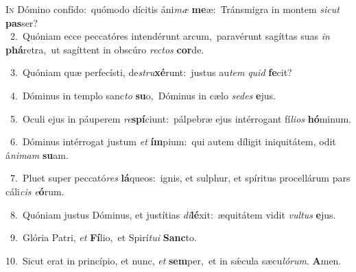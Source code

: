 \lettrine{\initial\textcolor{\initialcolor}{I}}{n} Dómino confído:~\dagger quómodo dícitis áni\textit{mæ} \textbf{me}\-æ:~\star Tránsmigra in montem \textit{sic}\-\textit{ut} \textbf{pas}\-ser?\\
{\numbfont\textcolor{\numbcolor}{~2.}}~Quóniam ecce peccatóres intendérunt arcum,~\dagger paravérunt sagíttas suas \textit{in} \textbf{phá}\-retra,~\star ut sagíttent in obscúro \textit{rec}\-\textit{tos} \textbf{cor}\-de.\par
{\numbfont\textcolor{\numbcolor}{~3.}}~Quóniam quæ perfecísti, de\-\textit{stru}\-\textbf{xé}runt:~\star justus au\textit{tem} \textit{quid} \textbf{fe}\-cit?\par
{\numbfont\textcolor{\numbcolor}{~4.}}~Dóminus in templo sanc\textit{to} \textbf{su}\-o,~\star Dóminus in cælo \textit{se}\-\textit{des} \textbf{e}\-jus.\par
{\numbfont\textcolor{\numbcolor}{~5.}}~Oculi ejus in páuperem \textit{re}\-\textbf{spí}ciunt:~\star pálpebræ ejus intérrogant fí\-\textit{li}\-\textit{os} \textbf{hó}\-minum.\par
{\numbfont\textcolor{\numbcolor}{~6.}}~Dóminus intérrogat justum \textit{et} \textbf{ím}\-pium:~\star qui autem díligit iniquitátem, odit á\-\textit{ni}\-\textit{mam} \textbf{su}\-am.\par
{\numbfont\textcolor{\numbcolor}{~7.}}~Pluet super peccató\textit{res} \textbf{lá}\-queos:~\star ignis, et sulphur, et spíritus procellárum pars cáli\textit{cis} \textit{e}\-\textbf{ó}rum.\par
{\numbfont\textcolor{\numbcolor}{~8.}}~Quóniam justus Dóminus, et justítias \textit{di}\-\textbf{lé}xit:~\star æquitátem vidit \textit{vul}\-\textit{tus} \textbf{e}\-jus.\par
{\numbfont\textcolor{\numbcolor}{~9.}}~Glória Patri, \textit{et} \textbf{Fí}\-lio,~\star et Spirí\-\textit{tu}\-\textit{i} \textbf{Sanc}\-to.\par
{\numbfont\textcolor{\numbcolor}{10.}}~Sicut erat in princípio, et nunc, \textit{et} \textbf{sem}\-per,~\star et in sǽcula sæcu\-\textit{ló}\-\textit{rum}. \textbf{A}\-men.\par
